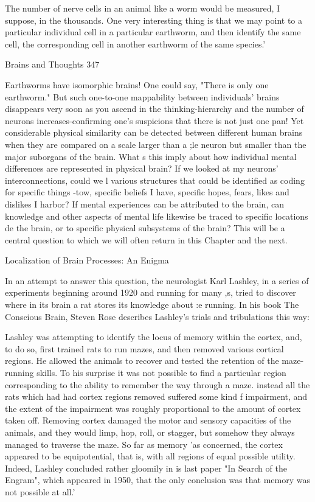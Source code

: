      The number of nerve cells in an animal like a worm would be measured, I
     suppose, in the thousands. One very interesting thing is that we may point to a
     particular individual cell in a particular earthworm, and then identify the same
     cell, the corresponding cell in another earthworm of the same species.'




Brains and Thoughts                                                                     347

Earthworms have isomorphic brains! One could say, "There is only one earthworm."
  But such one-to-one mappability between individuals' brains disappears very soon as
you ascend in the thinking-hierarchy and the number of neurons increases-confirming
one's suspicions that there is not just one pan! Yet considerable physical similarity can be
detected between different human brains when they are compared on a scale larger than a
;le neuron but smaller than the major suborgans of the brain. What s this imply about how
individual mental differences are represented in physical brain? If we looked at my
neurons' interconnections, could we l various structures that could be identified as coding
for specific things -tow, specific beliefs I have, specific hopes, fears, likes and dislikes I
harbor? If mental experiences can be attributed to the brain, can knowledge and other
aspects of mental life likewise be traced to specific locations de the brain, or to specific
physical subsystems of the brain? This will be a central question to which we will often
return in this Chapter and the next.

                       Localization of Brain Processes: An Enigma

In an attempt to answer this question, the neurologist Karl Lashley, in a series of
experiments beginning around 1920 and running for many ,s, tried to discover where in
its brain a rat stores its knowledge about :e running. In his book The Conscious Brain,
Steven Rose describes Lashley's trials and tribulations this way:

   Lashley was attempting to identify the locus of memory within the cortex, and, to do so,
   first trained rats to run mazes, and then removed various cortical regions. He allowed the
   animals to recover and tested the retention of the maze-running skills. To his surprise it
   was not possible to find a particular region corresponding to the ability to remember the
   way through a maze. instead all the rats which had had cortex regions removed suffered
   some kind f impairment, and the extent of the impairment was roughly proportional to the
   amount of cortex taken off. Removing cortex damaged the motor and sensory capacities
   of the animals, and they would limp, hop, roll, or stagger, but somehow they always
   managed to traverse the maze. So far as memory 'as concerned, the cortex appeared to be
   equipotential, that is, with all regions of equal possible utility. Indeed, Lashley concluded
   rather gloomily in is last paper "In Search of the Engram", which appeared in 1950, that
   the only conclusion was that memory was not possible at all.'

